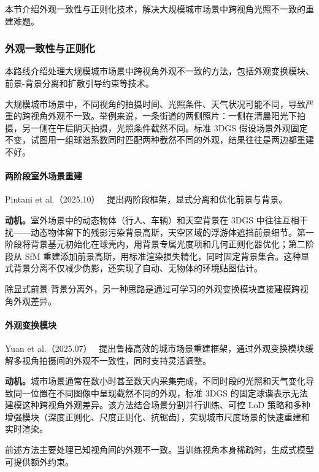 本节介绍外观一致性与正则化技术，解决大规模城市场景中跨视角光照不一致的重建难题。

\subsubsection{外观一致性与正则化}

本路线介绍处理大规模城市场景中跨视角外观不一致的方法，包括外观变换模块、前景-背景分离和扩散引导约束等技术。

大规模城市场景中，不同视角的拍摄时间、光照条件、天气状况可能不同，导致严重的跨视角外观不一致。举例来说，一条街道的两侧照片：一侧在清晨阳光下拍摄，另一侧在午后阴天拍摄，光照条件截然不同。标准 3DGS 假设场景外观固定不变，试图用一组球谐系数同时匹配两种截然不同的外观，结果往往是两边都重建不好。

\paragraph{两阶段室外场景重建}

Pintani et al.（2025.10）~\cite{2510_09489} 提出两阶段框架，显式分离和优化前景与背景。

\textbf{动机。}室外场景中的动态物体（行人、车辆）和天空背景在 3DGS 中往往互相干扰——动态物体留下的残影污染背景高斯，天空区域的浮游体遮挡前景细节。第一阶段将背景基元初始化在球壳内，用背景专属光度项和几何正则化器优化；第二阶段从 SfM 重建添加前景高斯，用标准渲染损失精化，同时固定背景集合。这种显式背景分离不仅减少伪影，还实现了自动、无物体的环境贴图估计。

除显式前景-背景分离外，另一种思路是通过可学习的外观变换模块直接建模跨视角外观差异。

\paragraph{外观变换模块}

Yuan et al.（2025.07）~\cite{2507_23006} 提出鲁棒高效的城市场景重建框架，通过外观变换模块缓解多视角拍摄间的外观不一致性，同时支持灵活调整。

\textbf{动机。}城市场景通常在数小时甚至数天内采集完成，不同时段的光照和天气变化导致同一位置在不同图像中呈现截然不同的外观，标准 3DGS 的固定球谐表示无法建模这种跨视角外观差异。该方法结合场景分割并行训练、可控 LoD 策略和多种增强模块（深度正则化、尺度正则化、抗锯齿），实现城市尺度场景的快速重建和实时渲染。

前述方法主要处理已知视角间的外观不一致。当训练视角本身稀疏时，生成式模型可提供额外约束。

